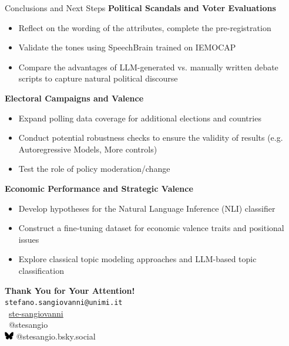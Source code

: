 \documentclass[9pt, aspectratio=169]{beamer}
\newcommand{\customcite}[1]{\textcolor{blue}{\footnotesize\parencite{#1}}}
\begin{document}
\begin{frame}{Conclusions and Next Steps}
    \textbf{Political Scandals and Voter Evaluations}
    \begin{itemize}
        \item Reflect on the wording of the attributes, complete the pre-registration
        \item Validate the tones using SpeechBrain \customcite{speechbrain} trained on IEMOCAP
        \item Compare the advantages of LLM-generated vs. manually written debate scripts to capture natural political discourse
    \end{itemize}
    \vspace{0.2cm}
    \textbf{Electoral Campaigns and Valence}
    \begin{itemize}
        \item Expand polling data coverage for additional elections and countries
        \item Conduct potential robustness checks to ensure the validity of results (e.g. Autoregressive Models, More controls)
        \item Test the role of policy moderation/change 
    \end{itemize}
    \vspace{0.2cm}
    \textbf{Economic Performance and Strategic Valence}
    \begin{itemize}
        \item Develop hypotheses for the Natural Language Inference (NLI) classifier
        \item Construct a fine-tuning dataset for economic valence traits and positional issues
        \item Explore classical topic modeling approaches and LLM-based topic classification
    \end{itemize}
    \end{frame}

\begin{frame}[plain]
\centering
\vspace{2cm}
\textbf{\large Thank You for Your Attention!} \\ [0.2cm] 
\texttt{stefano.sangiovanni@unimi.it} \\[3cm]

\faGithub\ \href{https://github.com/ste-sangiovanni}{ste-sangiovanni} \\[0.1cm]
\faTwitter\ @stesangio \\ 
\includegraphics[width=0.03\textwidth]{images/Bluesky_logo_(black).svg.png} @stesangio.bsky.social
\vspace{0.2cm}
\end{frame}
\end{document}
